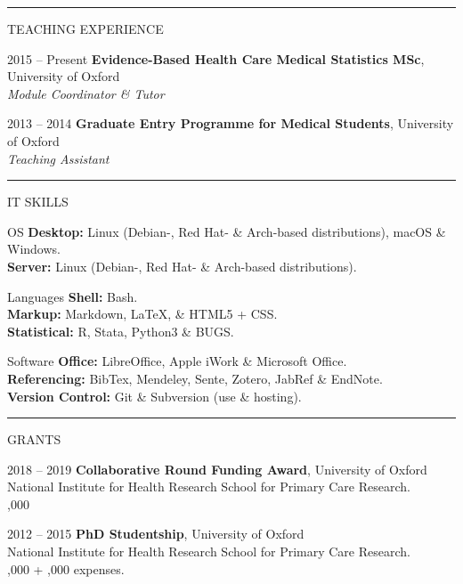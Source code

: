 \documentclass[10pt,a4paper]{article}
\begin{document}
\noindent\rule{\textwidth}{0.4pt}
\begin{cvlist}{TEACHING EXPERIENCE}
  
  \item[2015 -- Present]
  \textbf{Evidence-Based Health Care Medical Statistics MSc}, University of Oxford \\
  \textit{Module Coordinator \& Tutor}
  
  \item[2013 -- 2014]
  \textbf{Graduate Entry Programme for Medical Students}, University of Oxford \\
  \textit{Teaching Assistant}
  
\end{cvlist}


\noindent\rule{\textwidth}{0.4pt}
\begin{cvlist}{IT SKILLS}

  \item[OS]
  \textbf{Desktop:} Linux (Debian-, Red Hat- \& Arch-based distributions), macOS \& Windows. \\
  \textbf{Server:} Linux (Debian-, Red Hat- \& Arch-based distributions).
  
  \item[Languages]
  \textbf{Shell:} Bash. \\
  \textbf{Markup:} Markdown, \LaTeX , \& HTML5 + CSS. \\
  \textbf{Statistical:} R, Stata, Python3 \& BUGS.
  
  \item[Software]
  \textbf{Office:} LibreOffice, Apple iWork \& Microsoft Office. \\
  \textbf{Referencing:} BibTex, Mendeley, Sente, Zotero, JabRef \& EndNote. \\
  \textbf{Version Control:} Git \& Subversion (use \& hosting).
  
\end{cvlist}


\noindent\rule{\textwidth}{0.4pt}
\begin{cvlist}{GRANTS}
  
  \item[2018 -- 2019]
  \textbf{Collaborative Round Funding Award}, University of Oxford \\
  National Institute for Health Research School for Primary Care Research. \\
  ,000
  
  \item[2012 -- 2015]
  \textbf{PhD Studentship}, University of Oxford \\
  National Institute for Health Research School for Primary Care Research. \\
  ,000 + ,000 expenses.
  
\end{cvlist}
\end{document}
